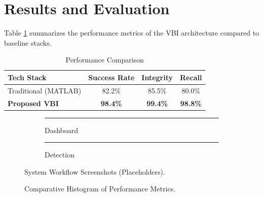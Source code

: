 \documentclass[conference]{IEEEtran}
\begin{document}
\section{Results and Evaluation}
Table \ref{tab:model_comparison} summarizes the performance metrics of the VBI architecture compared to baseline stacks.

\begin{table}[h]
\caption{Performance Comparison}
\label{tab:model_comparison}
\centering
\begin{tabular}{@{}lccc@{}}
\toprule
\textbf{Tech Stack} & \textbf{Success Rate} & \textbf{Integrity} & \textbf{Recall} \\
\midrule
Traditional (MATLAB) & 82.2\% & 85.5\% & 80.0\% \\
\textbf{Proposed VBI} & \textbf{98.4\%} & \textbf{99.4\%} & \textbf{98.8\%} \\
\bottomrule
\end{tabular}
\end{table}

\begin{figure}[!h]
\centering
\begin{subfigure}{0.48\columnwidth}
    \centering
    \rule{\textwidth}{2cm} %
    \caption{Dashboard}
\end{subfigure}
\hfill
\begin{subfigure}{0.48\columnwidth}
    \centering
    \rule{\textwidth}{2cm} %
    \caption{Detection}
\end{subfigure}
\caption{System Workflow Screenshots (Placeholders).}
\label{fig:screenshots}
\end{figure}

\begin{figure}[!t]
\centering
{}
\caption{Comparative Histogram of Performance Metrics.}
\label{fig:histogram}
\end{figure}
\end{document}
